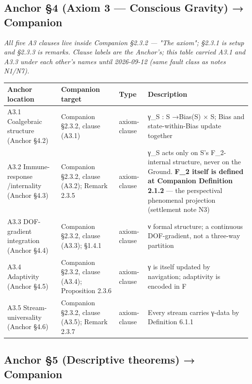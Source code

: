 \documentclass[11pt, openany]{book}
\begin{document}
\subsection{Anchor §4 (Axiom 3 --- Conscious Gravity) → Companion}

\textit{All five A3 clauses live inside Companion §2.3.2 --- "The axiom"; §2.3.1 is setup and §2.3.3 is remarks. Clause labels are the Anchor's; this table carried A3.1 and A3.3 under each other's names until 2026-09-12 (same fault class as notes N1/N7).}

\begingroup\setlength{\tabcolsep}{3pt}\renewcommand{\arraystretch}{1.15}\footnotesize
\begin{center}
\begin{tabular}{p{0.64in} p{0.66in} p{0.55in} p{2.43in}}
\toprule
Anchor location & Companion target & Type & Description \\
\midrule
A3.1 Coalgebraic structure (Anchor §4.2) & Companion §2.3.2, clause (A3.1) & axiom-clause & γ\_\allowbreak{}S : S →\allowbreak  Bias(S) × S; Bias and state-within-Bias update together \\
A3.2 Immune-response /\allowbreak  internality (Anchor §4.3) & Companion §2.3.2, clause (A3.2); Remark 2.3.5 & axiom-clause & γ\_\allowbreak{}S acts only on S's F\_\allowbreak{}2-internal structure, never on the Ground. \textbf{F\_\allowbreak{}2 itself is defined at Companion Definition 2.1.2} --- the perspectival phenomenal projection (settlement note N3) \\
A3.3 DOF-gradient integration (Anchor §4.4) & Companion §2.3.2, clause (A3.3); §1.4.1 & axiom-clause & ν formal structure; a continuous DOF-gradient, not a three-way partition \\
A3.4 Adaptivity (Anchor §4.5) & Companion §2.3.2, clause (A3.4); Proposition 2.3.6 & axiom-clause & γ is itself updated by navigation; adaptivity is encoded in F \\
A3.5 Stream-universality (Anchor §4.6) & Companion §2.3.2, clause (A3.5); Remark 2.3.7 & axiom-clause & Every stream carries γ-data by Definition 6.1.1 \\
\bottomrule
\end{tabular}
\end{center}
\endgroup
\subsection{Anchor §5 (Descriptive theorems) → Companion}
\end{document}
